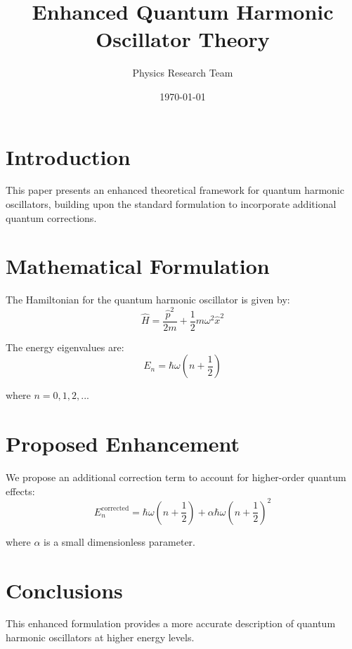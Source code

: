 \documentclass{article}
\title{Enhanced Quantum Harmonic Oscillator Theory}
\author{Physics Research Team}
\date{\today}
\begin{document}
\maketitle

\section{Introduction}
This paper presents an enhanced theoretical framework for quantum harmonic oscillators, building upon the standard formulation to incorporate additional quantum corrections.

\section{Mathematical Formulation}
The Hamiltonian for the quantum harmonic oscillator is given by:
\begin{equation}
\hat{H} = \frac{\hat{p}^2}{2m} + \frac{1}{2}m\omega^2\hat{x}^2
\end{equation}

The energy eigenvalues are:
\begin{equation}
E_n = \hbar\omega\left(n + \frac{1}{2}\right)
\end{equation}

where $n = 0, 1, 2, ...$

\section{Proposed Enhancement}
We propose an additional correction term to account for higher-order quantum effects:
\begin{equation}
E_n^{\text{corrected}} = \hbar\omega\left(n + \frac{1}{2}\right) + \alpha\hbar\omega\left(n + \frac{1}{2}\right)^2
\end{equation}

where $\alpha$ is a small dimensionless parameter.

\section{Conclusions}
This enhanced formulation provides a more accurate description of quantum harmonic oscillators at higher energy levels.
\end{document}
